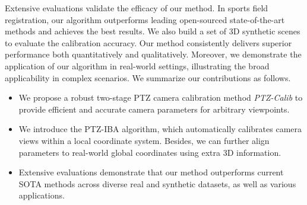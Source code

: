 Extensive evaluations validate the efficacy of our method. In sports field registration, our algorithm outperforms leading open-sourced state-of-the-art methods and achieves the best results. We also build a set of 3D synthetic scenes to evaluate the calibration accuracy. Our method consistently delivers superior performance both quantitatively and qualitatively. Moreover, we demonstrate the application of our algorithm in real-world settings, illustrating the broad applicability in complex scenarios. We summarize our contributions as follows. 

\begin{itemize}
    \item We propose a robust two-stage PTZ camera calibration method \emph{PTZ-Calib} to provide efficient and accurate camera parameters for arbitrary viewpoints.
    \item We introduce the PTZ-IBA algorithm, which automatically calibrates camera views within a local coordinate system. Besides, we can further align parameters to real-world global coordinates using extra 3D information.
    \item Extensive evaluations demonstrate that our method outperforms current SOTA methods across diverse real and synthetic datasets, as well as various applications.
\end{itemize}
